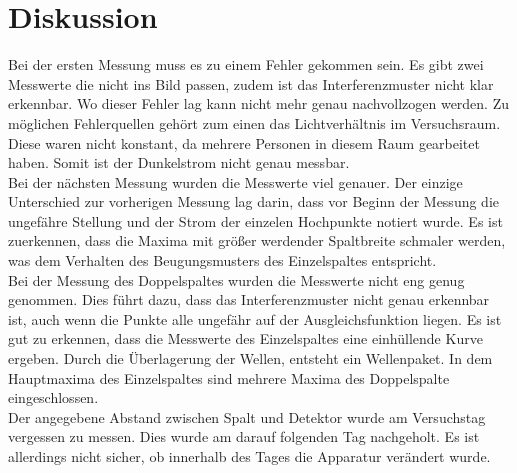 \section{Diskussion}
Bei der ersten Messung muss es zu einem Fehler gekommen sein.
Es gibt zwei Messwerte die nicht ins Bild passen, zudem ist das Interferenzmuster nicht klar erkennbar.
Wo dieser Fehler lag kann nicht mehr genau nachvollzogen werden.
Zu möglichen Fehlerquellen gehört zum einen das Lichtverhältnis im Versuchsraum.
Diese waren nicht konstant, da mehrere Personen in diesem Raum gearbeitet haben.
Somit ist der Dunkelstrom nicht genau messbar.\\
Bei der nächsten Messung wurden die Messwerte viel genauer.
Der einzige Unterschied zur vorherigen Messung lag darin,
dass vor Beginn der Messung die ungefähre Stellung und der Strom der einzelen Hochpunkte notiert wurde.
Es ist zuerkennen, dass die Maxima mit größer werdender Spaltbreite schmaler werden,
was dem Verhalten des Beugungsmusters des Einzelspaltes entspricht.\\
Bei der Messung des Doppelspaltes wurden die Messwerte nicht eng genug genommen.
Dies führt dazu, dass das Interferenzmuster nicht genau erkennbar ist,
auch wenn die Punkte alle ungefähr auf der Ausgleichsfunktion liegen.
Es ist gut zu erkennen, dass die Messwerte des Einzelspaltes eine einhüllende Kurve ergeben.
Durch die Überlagerung der Wellen, entsteht ein Wellenpaket.
In dem Hauptmaxima des Einzelspaltes sind mehrere Maxima des Doppelspalte eingeschlossen.\\
Der angegebene Abstand zwischen Spalt und Detektor wurde am Versuchstag vergessen zu messen.
Dies wurde am darauf folgenden Tag nachgeholt.
Es ist allerdings nicht sicher, ob innerhalb des Tages die Apparatur verändert wurde.

